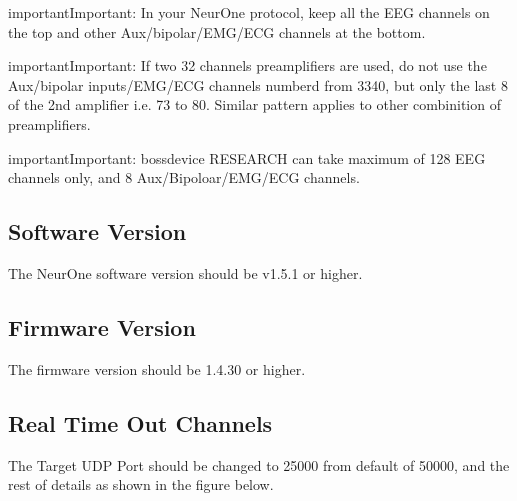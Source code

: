 \documentclass[letterpaper,10pt,english]{sphinxmanual}
\begin{document}
\begin{sphinxadmonition}{important}{Important:}
\sphinxAtStartPar
In your NeurOne protocol, keep all the EEG channels on the top and other Aux/bipolar/EMG/ECG channels at the bottom.
\end{sphinxadmonition}

\begin{sphinxadmonition}{important}{Important:}
\sphinxAtStartPar
If two 32 channels preamplifiers are used, do not use the Aux/bipolar inputs/EMG/ECG channels numberd from 33\sphinxhyphen{}40, but only the last 8 of the 2nd amplifier i.e. 73 to 80. Similar pattern applies to other combinition of preamplifiers.
\end{sphinxadmonition}

\begin{sphinxadmonition}{important}{Important:}
\sphinxAtStartPar
bossdevice RESEARCH can take maximum of 128 EEG channels only, and 8 Aux/Bipoloar/EMG/ECG channels.
\end{sphinxadmonition}


\subsection{Software Version}
\label{\detokenize{3_setup_biosignal_amplifier:software-version}}
\sphinxAtStartPar
The NeurOne software version should be v1.5.1 or higher.

\begin{figure}[htbp]
\centering

\noindent{}
\end{figure}


\subsection{Firmware Version}
\label{\detokenize{3_setup_biosignal_amplifier:firmware-version}}
\sphinxAtStartPar
The firmware version should be 1.4.30 or higher.


\subsection{Real Time Out Channels}
\label{\detokenize{3_setup_biosignal_amplifier:real-time-out-channels}}
\sphinxAtStartPar
The Target UDP Port should be changed to 25000 from default of 50000, and the rest of details as shown in the figure below.

\begin{figure}[htbp]
\centering

\noindent{}
\end{figure}
\end{document}
